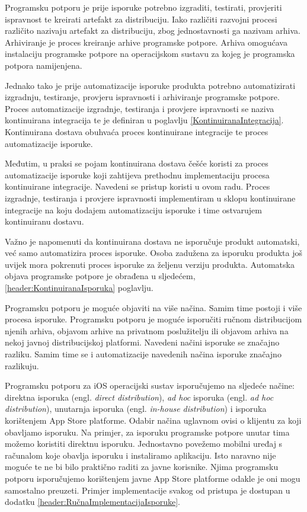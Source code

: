 \documentclass[times, utf8, diplomski, numeric]{fer}
\newcommand{\eng}[1]{(engl. \textit{#1})}
\begin{document}
Programsku potporu je prije isporuke potrebno izgraditi, testirati, provjeriti ispravnost te kreirati artefakt za distribuciju. Iako različiti razvojni procesi različito nazivaju artefakt za distribuciju, zbog jednostavnosti ga nazivam arhiva. Arhiviranje je proces kreiranje arhive programske potpore. Arhiva omogućava instalaciju programske potpore na operacijskom sustavu za kojeg je programska potpora namijenjena.

Jednako tako je prije automatizacije isporuke produkta potrebno automatizirati izgradnju, testiranje, provjeru ispravnosti i arhiviranje programske potpore. Proces automatizacije izgradnje, testiranja i provjere ispravnosti se naziva kontinuirana integracija te je definiran u poglavlju \ref{KontinuiranaIntegracija}. Kontinuirana dostava obuhvaća proces kontinuirane integracije te proces automatizacije isporuke.

Međutim, u praksi se pojam kontinuirana dostava češće koristi za proces automatizacije isporuke koji zahtijeva prethodnu implementaciju procesa kontinuirane integracije. Navedeni se pristup koristi u ovom radu. Proces izgradnje, testiranja i provjere ispravnosti implementiram u sklopu kontinuirane integracije na koju dodajem automatizaciju isporuke i time ostvarujem kontinuiranu dostavu.

Važno je napomenuti da kontinuirana dostava ne isporučuje produkt automatski, već samo automatizira proces isporuke. Osoba zadužena za isporuku produkta još uvijek mora pokrenuti proces isporuke za željenu verziju produkta. Automatska objava programske potpore je obrađena u sljedećem, \ref{header:KontinuiranaIsporuka} poglavlju.

Programsku potporu je moguće objaviti na više načina. Samim time postoji i više procesa isporuke. Programsku potporu je moguće isporučiti ručnom distribucijom njenih arhiva, objavom arhive na privatnom poslužitelju ili objavom arhiva na nekoj javnoj distribucijskoj platformi. Navedeni načini isporuke se značajno razliku. Samim time se i automatizacije navedenih načina isporuke značajno razlikuju.

Programsku potporu za iOS operacijski sustav isporučujemo na sljedeće načine: direktna isporuka \eng{direct distribution}, \textit{ad hoc} isporuka \eng{ad hoc distribution}, unutarnja isporuka \eng{in-house distribution} i isporuka korištenjem App Store platforme. Odabir načina uglavnom ovisi o klijentu za koji obavljamo isporuku. Na primjer, za isporuku programske potpore unutar tima možemo koristiti direktnu isporuku. Jednostavno povežemo mobilni uređaj s računalom koje obavlja isporuku i instaliramo aplikaciju. Isto naravno nije moguće te ne bi bilo praktično raditi za javne korisnike. Njima programsku potporu isporučujemo korištenjem javne App Store platforme odakle je oni mogu samostalno preuzeti. Primjer implementacije svakog od pristupa je dostupan u dodatku \ref{header:RučnaImplementacijaIsporuke}.
\end{document}
